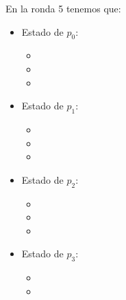 En la ronda 5 tenemos que:
\begin{multicols}{2}
\begin{itemize}
\item Estado de $p_0$:
      \begin{itemize}
      \item {}
      
      \item {}
      
      \item {}
      \end{itemize}
      
\item Estado de $p_1$:
      \begin{itemize}
      \item {}
      
      \item {}
      
      \item {}
      \end{itemize}

\item Estado de $p_2$:
      \begin{itemize}
      \item {}
      
      \item {}
      
      \item {}
      \end{itemize}

\item Estado de $p_3$:
      \begin{itemize}
      \item {}
      
      \item {}
      

\end{itemize}
\end{itemize}
\end{multicols}
